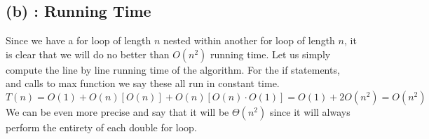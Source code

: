 \documentclass{article}
\begin{document}
\subsection*{(b) : Running Time}
Since we have a for loop of length $n$ nested within another for loop of length $n$, it is
clear that we will do no better than $O(n^2)$ running time. Let us simply compute the line
by line running time of the algorithm. For the if statements, and calls to max function
we say these all run in constant time.
\[
    T(n) = O(1) + O(n)[O(n)] + O(n)[O(n) \cdot O(1)] = O(1) + 2 O(n^2) = O(n^2)
\]
We can be even more precise and say that it will be $\Theta (n^2)$ since it will always
perform the entirety of each double for loop.
\end{document}
